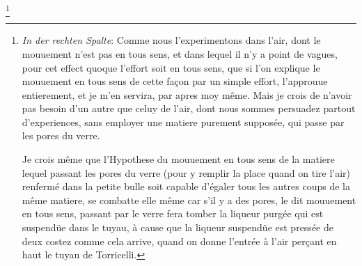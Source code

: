 \footnote{\textit{In der rechten Spalte}: %
Comme nous l'experimentons dans l'air, dont le mou\-uement n'est pas en tous sens, et dans lequel il n'y a point de vagues, pour cet effect %
quoque l'effort soit en tous sens, que si l'on explique le mouuement en tous sens de cette fa\c{c}on par un simple effort, %
l'approuue entierement, et je m'en servira, par apres moy même. Mais je crois de n'avoir pas besoin d'un autre que celuy de l'air, dont nous sommes persuadez partout d'experiences, sans %
employer une matiere purement suppos\'{e}e, qui passe par les pores du verre.\par%
Je crois même que l'Hypothese %
du mouuement en tous sens de la %
matiere lequel passant les pores du verre (pour y remplir la place quand on tire l'air) renferm\'{e} dans la petite bulle soit capable d'\'{e}galer %
tous les autres coups %
de la même matiere, se combatte elle même car s'il y a des pores, %
le dit mouuement en tous sens, passant par le verre fera tomber la liqueur purg\'{e}e qui est suspend\"{u}e dans le tuyau, \`{a} cause que la liqueur suspend\"{u}e est press\'{e}e de deux costez comme cela arrive, quand on donne %
l'entr\'{e}e \`{a} l'air per\c{c}ant en haut le tuyau de Torricelli\protect{}.}%
